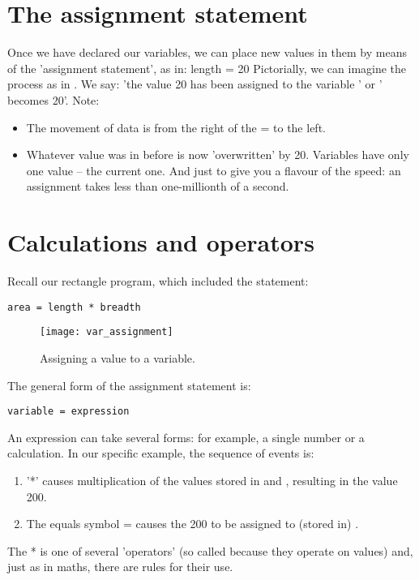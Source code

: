 	\section{The assignment statement}
		Once we have declared our variables, we can place new values in them by means of the 'assignment statement', as in:
length = 20
Pictorially, we can imagine the process as in . We say: 'the value 20 has been assigned to the variable ' or ' becomes 20'.
Note:
		\begin{itemize}
			\item The movement of data is from the right of the = to the left.
			\item Whatever value was in  before is now 'overwritten' by 20. Variables have only one value – the current one. And just to give you a flavour of the speed: an assignment takes less than one-millionth of a second.
		\end{itemize}

	\section{Calculations and operators}
		Recall our rectangle program, which included the statement:
		\begin{lstlisting}
area = length * breadth
		\end{lstlisting}

		\begin{figure}[ht]
			\centering
			\texttt{[image: var\_assignment]}
			\caption{Assigning a value to a variable.}
			\label{fig:var_assignment}
		\end{figure}

		The general form of the assignment statement is:
		\begin{lstlisting}
variable = expression
		\end{lstlisting}
		An expression can take several forms: for example, a single number or a calculation. In our specific example, the sequence of events is:
		\begin{enumerate}
			\item '*' causes multiplication of the values stored in  and , resulting in the value 200.
			\item The equals symbol = causes the 200 to be assigned to (stored in) .
		\end{enumerate}
		The * is one of several 'operators' (so called because they operate on values) and, just as in maths, there are rules for their use.
		
